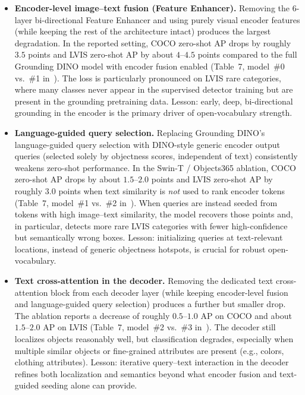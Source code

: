 \begin{enrichment}
\begin{enrichment}
		\begin{itemize}
			\item \textbf{Encoder-level image--text fusion (Feature Enhancer).}  
			Removing the 6-layer bi-directional Feature Enhancer and using purely visual encoder features (while keeping the rest of the architecture intact) produces the largest degradation. In the reported setting, COCO zero-shot AP drops by roughly \(3.5\) points and LVIS zero-shot AP by about \(4\)–\(4.5\) points compared to the full Grounding DINO model with encoder fusion enabled (Table~7, model~\#0 vs.\ \#1 in~\cite{liu2023_groundingdino}). The loss is particularly pronounced on LVIS rare categories, where many classes never appear in the supervised detector training but are present in the grounding pretraining data. Lesson: early, deep, bi-directional grounding in the encoder is the primary driver of open-vocabulary strength.
			
			\item \textbf{Language-guided query selection.}  
			Replacing Grounding DINO’s language-guided query selection with DINO-style generic encoder output queries (selected solely by objectness scores, independent of text) consistently weakens zero-shot performance. In the Swin-T / Objects365 ablation, COCO zero-shot AP drops by about \(1.5\)–\(2.0\) points and LVIS zero-shot AP by roughly \(3.0\) points when text similarity is \emph{not} used to rank encoder tokens (Table~7, model~\#1 vs.\ \#2 in~\cite{liu2023_groundingdino}). When queries are instead seeded from tokens with high image–text similarity, the model recovers those points and, in particular, detects more rare LVIS categories with fewer high-confidence but semantically wrong boxes. Lesson: initializing queries at text-relevant locations, instead of generic objectness hotspots, is crucial for robust open-vocabulary.
			
			\item \textbf{Text cross-attention in the decoder.}  
			Removing the dedicated text cross-attention block from each decoder layer (while keeping encoder-level fusion and language-guided query selection) produces a further but smaller drop. The ablation reports a decrease of roughly \(0.5\)–\(1.0\) AP on COCO and about \(1.5\)–\(2.0\) AP on LVIS (Table~7, model~\#2 vs.\ \#3 in~\cite{liu2023_groundingdino}). The decoder still localizes objects reasonably well, but classification degrades, especially when multiple similar objects or fine-grained attributes are present (e.g., colors, clothing attributes). Lesson: iterative query--text interaction in the decoder refines both localization and semantics beyond what encoder fusion and text-guided seeding alone can provide.
			

\end{itemize}
\end{enrichment}
\end{enrichment}
